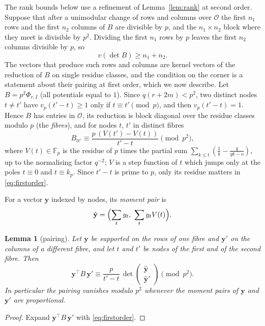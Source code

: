 \documentclass[11pt]{amsart}
\newtheorem{lemma}[theorem]{Lemma}
\theoremstyle{definition}
\theoremstyle{remark}
\numberwithin{equation}{section}
\newcommand{\F}{\mathbb F}
\newcommand{\cO}{\mathcal O}
\begin{document}
The rank bounds below use a refinement of Lemma~\ref{lem:rank} at second order. Suppose that after a unimodular change
of rows and columns over $\cO$ the first $n_1$ rows and the first $n_2$ columns of $B$ are divisible by $p$, and the
$n_1\times n_2$ block where they meet is divisible by $p^2$. Dividing the first $n_1$ rows by $p$ leaves the first $n_2$
columns divisible by $p$, so
\begin{equation}\label{eq:corner}
 v(\det B)\ge n_1+n_2 .
\end{equation}
The vectors that produce such rows and columns are kernel vectors of the reduction of $B$ on single residue classes,
and the condition on the corner is a statement about their pairing at first order, which we now describe. Let
$B=p^2\Phi_{r,I}$ (all potentials equal to $1$). Since $q(r+2m)<p^2$, two distinct nodes $t\ne t'$ have
$v_p(t'-t)\ge1$ only if $t\equiv t'\pmod p$, and then $v_p(t'-t)=1$. Hence $B$ has entries in $\cO$, its reduction is
block diagonal over the residue classes modulo $p$ (the \emph{fibres}), and for nodes $t$, $t'$ in distinct fibres
\begin{equation}\label{eq:firstorder}
 B_{tt'}\equiv\frac{p\,(V(t')-V(t))}{t'-t}\pmod{p^2},
\end{equation}
where $V(t)\in\F_p$ is the residue of $p$ times the partial sum $\sum_{k\le t}(\frac1k-\frac q{qk-o})$, up to the
normalising factor $q^{-2}$; $V$ is a step function of $t$ which jumps only at the poles $t\equiv0$ and $t\equiv k_p$. Since
$t'-t$ is prime to $p$, only its residue matters in \eqref{eq:firstorder}.

For a vector $\mathbf y$ indexed by nodes, its \emph{moment pair} is
\[
 \hat{\mathbf y}=\Bigl(\sum_ty_t,\ \sum_ty_tV(t)\Bigr).
\]

\begin{lemma}[pairing]\label{lem:pairing}
Let $\mathbf y$ be supported on the rows of one fibre and $\mathbf y'$ on the columns of a different fibre, and let $t$ and
$t'$ be nodes of the first and of the second fibre. Then
\[
 \mathbf y^{\top}B\,\mathbf y'\equiv\frac p{t'-t}\,\det\begin{pmatrix}\hat{\mathbf y}\\ \hat{\mathbf y}'\end{pmatrix}\pmod{p^2}.
\]
In particular the pairing vanishes modulo $p^2$ whenever the moment pairs of $\mathbf y$ and $\mathbf y'$ are proportional.
\end{lemma}
\begin{proof}
Expand $\mathbf y^{\top}B\,\mathbf y'$ with \eqref{eq:firstorder}.
\end{proof}
\end{document}

